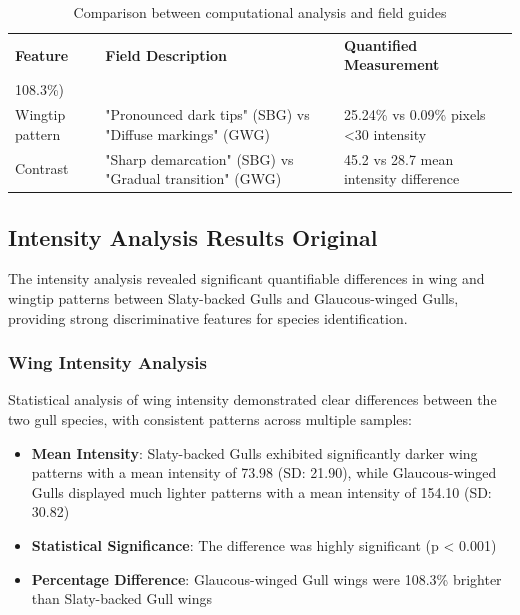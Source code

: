 \documentclass[a4paper,12pt]{report}
\begin{document}
\begin{table}[H]
\centering
\caption{Comparison between computational analysis and field guides}
\label{tab:field_comparison}
\begin{tabular}{lp{6cm}p{6cm}}
\hline
\textbf{Feature} & \textbf{Field Description} & \textbf{Quantified Measurement} \\108.3\%) \\
Wingtip pattern & "Pronounced dark tips" (SBG) vs "Diffuse markings" (GWG) & 25.24\% vs 0.09\% pixels <30 intensity \\
Contrast & "Sharp demarcation" (SBG) vs "Gradual transition" (GWG) & 45.2 vs 28.7 mean intensity difference \\
\end{tabular}
\end{table}

\subsection{Intensity Analysis Results Original}
The intensity analysis revealed significant quantifiable differences in wing and wingtip patterns between Slaty-backed Gulls and Glaucous-winged Gulls, providing strong discriminative features for species identification.

\subsubsection{Wing Intensity Analysis}
Statistical analysis of wing intensity demonstrated clear differences between the two gull species, with consistent patterns across multiple samples:

\begin{itemize}
    \item \textbf{Mean Intensity}: Slaty-backed Gulls exhibited significantly darker wing patterns with a mean intensity of 73.98 (SD: 21.90), while Glaucous-winged Gulls displayed much lighter patterns with a mean intensity of 154.10 (SD: 30.82)
    \item \textbf{Statistical Significance}: The difference was highly significant (p < 0.001)
    \item \textbf{Percentage Difference}: Glaucous-winged Gull wings were 108.3\% brighter than Slaty-backed Gull wings
\end{itemize}
\end{document}
